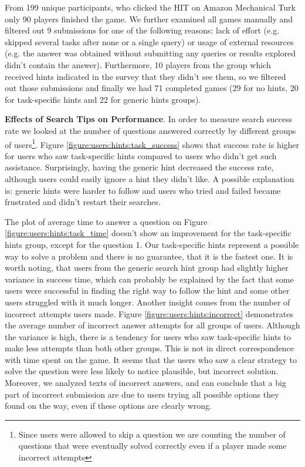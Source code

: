 From 199 unique participants, who clicked the HIT on Amazon Mechanical Turk only 90 players finished the game.
We further examined all games manually and filtered out 9 submissions for one of the following reasons: lack of effort (e.g. skipped several tasks after none or a single query) or usage of external resources (e.g. the answer was obtained without submitting any queries or results explored didn't contain the answer).
Furthermore, 10 players from the group which received hints indicated in the survey that they didn't see them, so we filtered out those submissions and finally we had 71 completed games (29 for no hints, 20 for task-specific hints and 22 for generic hints groups).

\textbf{Effects of Search Tips on Performance}.
In order to measure search success rate we looked at the number of questions answered correctly by different groups of users\footnote{Since users were allowed to skip a question we are counting the number of questions that were eventually solved correctly even if a player made some incorrect attempts}.
Figure \ref{figure:users:hints:task_success} shows that success rate is higher for users who saw task-specific hints compared to users who didn't get such assistance.
Surprisingly, having the generic hint decreased the success rate, although users could easily ignore a hint they didn't like.
A possible explanation is: generic hints were harder to follow and users who tried and failed became frustrated and didn't restart their searches.

The plot of average time to answer a question on Figure \ref{figure:users:hints:task_time} doesn't show an improvement for the task-specific hints group, except for the question 1.
Our task-specific hints represent a possible way to solve a problem and there is no guarantee, that it is the fastest one.
It is worth noting, that users from the generic search hint group had slightly higher variance in success time, which can probably be explained by the fact that some users were successful in finding the right way to follow the hint and some other users struggled with it much longer.
Another insight comes from the number of incorrect attempts users made.
Figure \ref{figure:users:hints:incorrect} demonstrates the average number of incorrect answer attempts for all groups of users.
Although the variance is high, there is a tendency for users who saw task-specific hints to make less attempts than both other groups.
This is not in direct correspondence with time spent on the game.
It seems that the users who saw a clear strategy to solve the question were less likely to notice plausible, but incorrect solution.
Moreover, we analyzed texts of incorrect answers, and can conclude that a big part of incorrect submission are due to users trying all possible options they found on the way, even if these options are clearly wrong.


